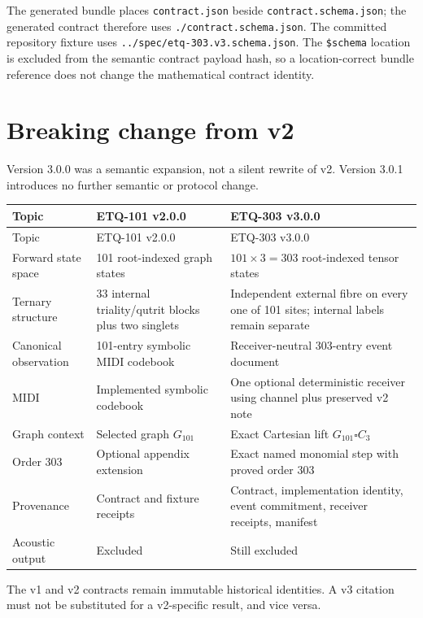 \documentclass[11pt,a4paper]{article}
\theoremstyle{definition}
\newcommand{\Gone}{G_{101}}
\begin{document}
The generated bundle places \texttt{contract.json} beside \texttt{contract.schema.json}; the generated contract therefore uses \texttt{./contract.schema.json}. The committed repository fixture uses \texttt{../spec/etq-303.v3.schema.json}. The \texttt{\$schema} location is excluded from the semantic contract payload hash, so a location-correct bundle reference does not change the mathematical contract identity.

\section{Breaking change from v2}
Version 3.0.0 was a semantic expansion, not a silent rewrite of v2. Version 3.0.1 introduces no further semantic or protocol change.

\begin{longtable}{@{}p{37mm}p{52mm}p{60mm}@{}}
\toprule
Topic & ETQ-101 v2.0.0 & ETQ-303 v3.0.0 \\
\midrule
\endfirsthead
\toprule
Topic & ETQ-101 v2.0.0 & ETQ-303 v3.0.0 \\
\midrule
\endhead
Forward state space & 101 root-indexed graph states & $101\times3=303$ root-indexed tensor states \\
Ternary structure & 33 internal triality/qutrit blocks plus two singlets & Independent external fibre on every one of 101 sites; internal labels remain separate \\
Canonical observation & 101-entry symbolic MIDI codebook & Receiver-neutral 303-entry event document \\
MIDI & Implemented symbolic codebook & One optional deterministic receiver using channel plus preserved v2 note \\
Graph context & Selected graph $\Gone$ & Exact Cartesian lift $\Gone\square C_3$ \\
Order 303 & Optional appendix extension & Exact named monomial step with proved order 303 \\
Provenance & Contract and fixture receipts & Contract, implementation identity, event commitment, receiver receipts, manifest \\
Acoustic output & Excluded & Still excluded \\
\bottomrule
\end{longtable}

The v1 and v2 contracts remain immutable historical identities. A v3 citation must not be substituted for a v2-specific result, and vice versa.
\end{document}
